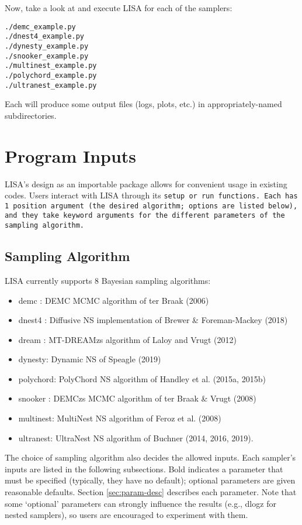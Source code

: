 \documentclass[letterpaper, 12pt]{article}
\begin{document}
\noindent Now, take a look at and execute LISA for each of the samplers:

\begin{verbatim}
./demc_example.py
./dnest4_example.py
./dynesty_example.py
./snooker_example.py
./multinest_example.py
./polychord_example.py
./ultranest_example.py
\end{verbatim}

\noindent Each will produce some output files (logs, plots, etc.) in 
appropriately-named subdirectories.\newline


\section{Program Inputs}
\label{sec:inputs}

LISA's design as an importable package allows for convenient usage in existing 
codes.  Users interact with LISA through its \tt{setup} or \tt{run} functions. 
Each has 1 position argument (the desired algorithm; options are listed below), 
and they take keyword arguments for the different parameters of the sampling 
algorithm.  

\subsection{Sampling Algorithm}

LISA currently supports 8 Bayesian sampling algorithms:
\begin{itemize}
\item demc   : DEMC MCMC algorithm of ter Braak (2006)
\item dnest4 : Diffusive NS implementation of Brewer \& Foreman-Mackey (2018)
\item dream  : MT-DREAMzs algorithm of Laloy and Vrugt (2012)
\item dynesty: Dynamic NS of Speagle (2019)
\item polychord: PolyChord NS algorithm of Handley et al. (2015a, 2015b)
\item snooker  : DEMCzs MCMC algorithm of ter Braak \& Vrugt (2008)
\item multinest: MultiNest NS algorithm of Feroz et al. (2008)
\item ultranest: UltraNest NS algorithm of Buchner (2014, 2016, 2019).
\end{itemize}

\noindent The choice of sampling algorithm also decides the allowed inputs.  
Each sampler's inputs are listed in the following subsections.  Bold 
indicates a parameter that must be specified (typically, they have no default); 
optional parameters are given reasonable defaults.  Section 
\ref{sec:param-desc} describes each parameter.  Note that some `optional' 
parameters can strongly influence the results (e.g., dlogz for nested samplers),
so users are encouraged to experiment with them.
\end{document}

